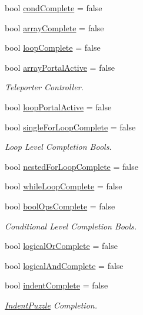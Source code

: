\begin{DoxyCompactItemize}
bool \hyperlink{class_global_controller_ae764fa91d71200973cd4f29027e75882}{cond\+Complete} = false
\item 
bool \hyperlink{class_global_controller_a5a822475cde64a740d5e956841f3f30c}{array\+Complete} = false
\item 
bool \hyperlink{class_global_controller_a3d0e1daed25e43680a859ef959ff415d}{loop\+Complete} = false
\item 
bool \hyperlink{class_global_controller_acfa3a6cc5d553935d62ddff74958a738}{array\+Portal\+Active} = false
\begin{DoxyCompactList}\small\item\em Teleporter Controller. \end{DoxyCompactList}\item 
bool \hyperlink{class_global_controller_adfcf0fc37bcbdcec0ad7bbe73a1a3f29}{loop\+Portal\+Active} = false
\item 
bool \hyperlink{class_global_controller_a3a46793d2eb2610e6271ea910fb7e233}{single\+For\+Loop\+Complete} = false
\begin{DoxyCompactList}\small\item\em Loop Level Completion Bools. \end{DoxyCompactList}\item 
bool \hyperlink{class_global_controller_a132d355ddde6363fddae3bc4f85b2678}{nested\+For\+Loop\+Complete} = false
\item 
bool \hyperlink{class_global_controller_a60806c4e71e7aab4127aca365a359b2d}{while\+Loop\+Complete} = false
\item 
bool \hyperlink{class_global_controller_a9486246c8e066ebc7d21633cba31d6a9}{bool\+Ops\+Complete} = false
\begin{DoxyCompactList}\small\item\em Conditional Level Completion Bools. \end{DoxyCompactList}\item 
bool \hyperlink{class_global_controller_a2f07e222a9f964dcf7fc1417f715da92}{logical\+Or\+Complete} = false
\item 
bool \hyperlink{class_global_controller_a8462e396ae3aa7f7616b0f101b5fb89c}{logical\+And\+Complete} = false
\item 
bool \hyperlink{class_global_controller_a150accbef592e8c2e099d8b7a109bbc5}{indent\+Complete} = false
\begin{DoxyCompactList}\small\item\em \hyperlink{class_indent_puzzle}{Indent\+Puzzle} Completion. \end{DoxyCompactList}\item 

\end{DoxyCompactItemize}
